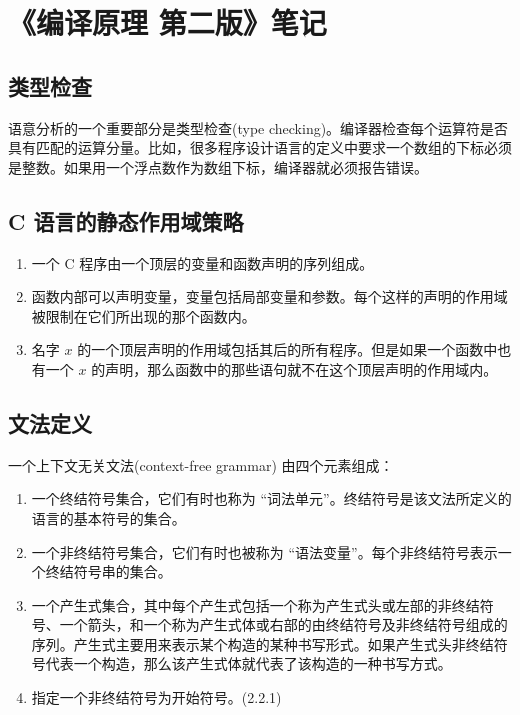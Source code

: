 \chapter{《编译原理 第二版》笔记}

\section*{类型检查}

语意分析的一个重要部分是类型检查(type checking)。编译器检查每个运算符是否具有匹配的运算分量。比如，很多程序设计语言的定义中要求一个数组的下标必须是整数。如果用一个浮点数作为数组下标，编译器就必须报告错误。

\section*{C 语言的静态作用域策略}

\begin{enumerate}
\item 一个 C 程序由一个顶层的变量和函数声明的序列组成。
\item 函数内部可以声明变量，变量包括局部变量和参数。每个这样的声明的作用域被限制在它们所出现的那个函数内。
\item 名字 $x$ 的一个顶层声明的作用域包括其后的所有程序。但是如果一个函数中也有一个 $x$ 的声明，那么函数中的那些语句就不在这个顶层声明的作用域内。
\end{enumerate}

\section*{文法定义}

一个上下文无关文法(context-free grammar) 由四个元素组成：
\begin{enumerate}
\item 一个终结符号集合，它们有时也称为 “词法单元”。终结符号是该文法所定义的语言的基本符号的集合。
\item 一个非终结符号集合，它们有时也被称为 “语法变量”。每个非终结符号表示一个终结符号串的集合。
\item 一个产生式集合，其中每个产生式包括一个称为产生式头或左部的非终结符号、一个箭头，和一个称为产生式体或右部的由终结符号及非终结符号组成的序列。产生式主要用来表示某个构造的某种书写形式。如果产生式头非终结符号代表一个构造，那么该产生式体就代表了该构造的一种书写方式。
\item 指定一个非终结符号为开始符号。(2.2.1)
\end{enumerate}


